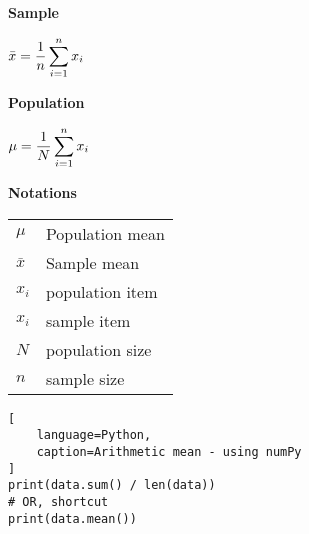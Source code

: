 \begin{table}[H]
\begin{minipage}[t]{0.25\linewidth}

\textbf{Sample} \cite{statistics/book/Statistics-for-Data-Scientists/Maurits-Kaptein} \label{Data/Describing Data/Central Tendency/(Arithmetic) mean or average/Sample}

\vspace{0.3cm}

$
    \bar{x} = \dfrac{1}{n} \displaystyle\sum_{i=1}^{n} x_i
$

\end{minipage}
\hspace{0.3cm}
\vrule width 1pt
\hspace{0.3cm}
\begin{minipage}[t]{0.25\linewidth}

\textbf{Population} \cite{statistics/book/Statistics-for-Data-Scientists/Maurits-Kaptein} \label{Data/Describing Data/Central Tendency/(Arithmetic) mean or average/Population}

\vspace{0.3cm}

$
    \mu = \dfrac{1}{N} \displaystyle\sum_{i=1}^{n} x_i
$

\end{minipage}
\hspace{0.3cm}
\vrule width 1pt
\hspace{0.3cm}
\begin{minipage}[t]{0.25\linewidth}

{\hfill\textbf{Notations}\hfill}

\begin{table}[H]
    \begin{tabular}{l l}
        $\mu$ & Population mean \\
        $\bar{x}$ & Sample mean \\
        $x_i$ & population item \\
        $x_i$ & sample item \\
        $N$ & population size \\
        $n$ & sample size \\
    \end{tabular}
\end{table}


\end{minipage}
\end{table}






\begin{lstlisting}[
    language=Python, 
    caption=Arithmetic mean - using numPy
]
print(data.sum() / len(data))
# OR, shortcut
print(data.mean())
\end{lstlisting}



